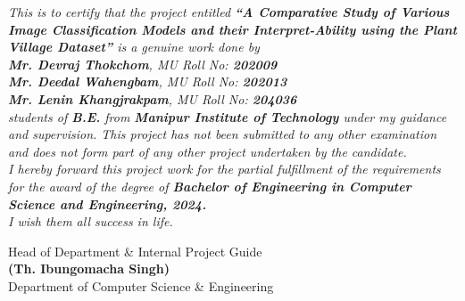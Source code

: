 \documentclass[12pt, oneside, a4paper]{book}
\begin{document}
\begingroup
    \begin{onehalfspace}
  \color{black}
  \textit{This is to certify that the project entitled \textbf{``A Comparative Study of Various Image Classification Models and their Interpret-Ability using the Plant Village Dataset''} is a genuine work done by}\\[1em]
    \textit{\hspace*{4em}\textbf{Mr. Devraj Thokchom}, MU Roll No: \textbf{202009}\\
    \hspace*{4em}\textbf{Mr. Deedal Wahengbam}, MU Roll No: \textbf{202013}\\
    \hspace*{4em}\textbf{Mr. Lenin Khangjrakpam}, MU Roll No: \textbf{204036}}\\[1em]

    \indent \textit{students of \textbf{B.E.} from \textbf{Manipur Institute of Technology} under my guidance and supervision. This project has not been submitted to any other examination and does not form part of any other project undertaken by the candidate.}\\
    \indent \textit{I hereby forward this project work for the partial fulfillment of the requirements for the award of the degree of \textbf{Bachelor of Engineering in Computer Science and Engineering, 2024.}\\
    I wish them all success in life.}
    \end{onehalfspace}
\endgroup

\vspace{7em}

\begingroup
       \begin{flushright}
        \begin{minipage}{0.6\textwidth}
            \centering
            \color{black}Head of Department \& Internal Project Guide \\
            \vspace{1em}
            \color{orange}\textbf{(Th. Ibungomacha Singh)} \\
           \color{green} Department of Computer Science \& Engineering\\
        \end{minipage}
    \end{flushright}
\endgroup
\end{document}
